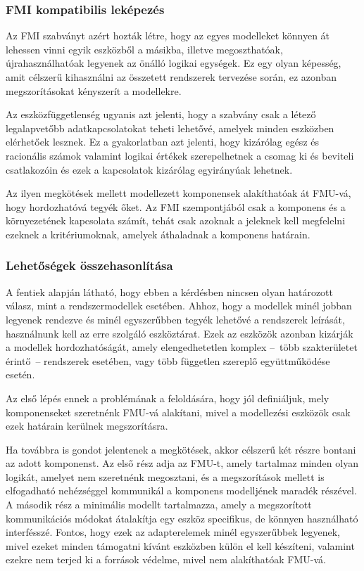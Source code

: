         \subsubsection{FMI kompatibilis leképezés} \label{sec:fmiKompat}
        Az FMI szabványt azért hozták létre, hogy az egyes modelleket könnyen át lehessen vinni egyik eszközből a másikba, illetve megoszthatóak, újrahasználhatóak legyenek az önálló logikai egységek.
        Ez egy olyan képesség, amit célszerű kihasználni az összetett rendszerek tervezése során, ez azonban megszorításokat kényszerít a modellekre.
        
        Az eszközfüggetlenség ugyanis azt jelenti, hogy a szabvány csak a létező legalapvetőbb adatkapcsolatokat teheti lehetővé, amelyek minden eszközben elérhetőek lesznek.
        Ez a gyakorlatban azt jelenti, hogy kizárólag egész és racionális számok valamint logikai értékek szerepelhetnek a csomag ki és beviteli csatlakozóin és ezek a kapcsolatok kizárólag egyirányúak lehetnek.
        
        Az ilyen megkötések mellett modellezett komponensek alakíthatóak át FMU-vá, hogy hordozhatóvá tegyék őket.
        Az FMI szempontjából csak a komponens és a környezetének kapcsolata számít, tehát csak azoknak a jeleknek kell megfelelni ezeknek a kritériumoknak, amelyek áthaladnak a komponens határain.

        \subsubsection{Lehetőségek összehasonlítása}
        A fentiek alapján látható, hogy ebben a kérdésben nincsen olyan határozott válasz, mint a rendszermodellek esetében.
        Ahhoz, hogy a modellek minél jobban legyenek rendezve és minél egyszerűbben tegyék lehetővé a rendszerek leírását, használnunk kell az erre szolgáló eszköztárat.
        Ezek az eszközök azonban kizárják a modellek hordozhatóságát, amely elengedhetetlen komplex --~több szakterületet érintő~-- rendszerek esetében, vagy több független szereplő együttműködése esetén.
        
        Az első lépés ennek a problémának a feloldására, hogy jól definiáljuk, mely komponenseket szeretnénk FMU-vá alakítani, mivel a modellezési eszközök csak ezek határain kerülnek megszorításra.
        
        Ha továbbra is gondot jelentenek a megkötések, akkor célszerű két részre bontani az adott komponenst.
        Az első rész adja az FMU-t, amely tartalmaz minden olyan logikát, amelyet nem szeretnénk megosztani, és a megszorítások mellett is elfogadható nehézséggel kommunikál a komponens modelljének maradék részével.
        A második rész a minimális modellt tartalmazza, amely a megszorított kommunikációs módokat átalakítja egy eszköz specifikus, de könnyen használható interfésszé.
        Fontos, hogy ezek az adapterelemek minél egyszerűbbek legyenek, mivel ezeket minden támogatni kívánt eszközben külön el kell készíteni, valamint ezekre nem terjed ki a források védelme, mivel nem alakíthatóak FMU-vá.
        
